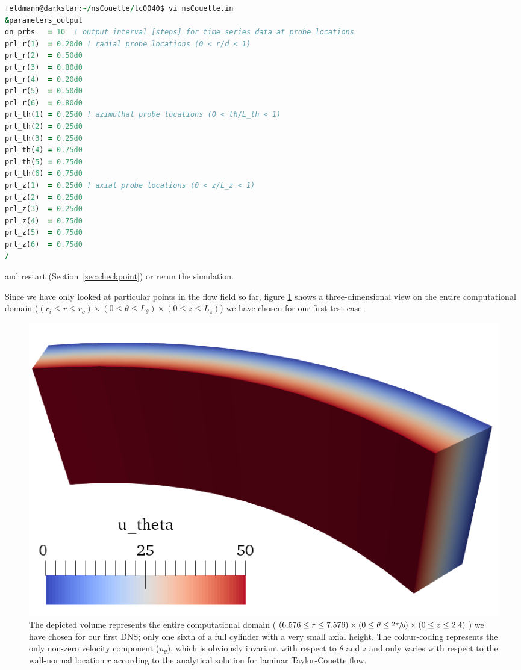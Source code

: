 \documentclass[a4paper, 11pt, DIV=11]{scrartcl}
\begin{document}
\begin{lstlisting}[language=Fortran]
feldmann@darkstar:~/nsCouette/tc0040$ vi nsCouette.in
&parameters_output
dn_prbs   = 10  ! output interval [steps] for time series data at probe locations
prl_r(1)  = 0.20d0 ! radial probe locations (0 < r/d < 1)
prl_r(2)  = 0.50d0
prl_r(3)  = 0.80d0
prl_r(4)  = 0.20d0
prl_r(5)  = 0.50d0
prl_r(6)  = 0.80d0
prl_th(1) = 0.25d0 ! azimuthal probe locations (0 < th/L_th < 1)
prl_th(2) = 0.25d0
prl_th(3) = 0.25d0
prl_th(4) = 0.75d0
prl_th(5) = 0.75d0
prl_th(6) = 0.75d0
prl_z(1)  = 0.25d0 ! axial probe locations (0 < z/L_z < 1)
prl_z(2)  = 0.25d0
prl_z(3)  = 0.25d0
prl_z(4)  = 0.75d0
prl_z(5)  = 0.75d0
prl_z(6)  = 0.75d0
/
\end{lstlisting}
and restart (Section~\ref{sec:checkpoint}) or rerun the simulation.
\par
Since we have only looked at particular points in the flow field so far,
figure \ref{fig:tc0040laminarTaylorCouette} shows a three-dimensional
view on the entire computational domain ($(r_{i}\le r\le r_{o}) \times
(\num{0}\le\theta\le L_{\theta}) \times (\num{0}\le z\le L_{z})$) we have
chosen for our first test case.
\begin{figure}[htb]
\centering
\includegraphics[width=1.00\textwidth]{figures/tc0040/laminarTaylorCouette.png}
\caption{The depicted volume represents the entire computational domain
($(\num{6.576}\le r\le\num{7.576}) \times (\num{0}\le\theta\le\sfrac{2\pi}{6})
\times (\num{0}\le z\le\num{2.4})$) we have chosen for our first DNS; \ie only
one sixth of a full cylinder with a very small axial height. The colour-coding
represents the only non-zero velocity component ($u_{\theta}$), which is
obviously invariant with respect to $\theta$ and $z$ and only varies with
respect to the wall-normal location $r$ according to the analytical solution
for laminar Taylor-Couette flow.}
\label{fig:tc0040laminarTaylorCouette}
\end{figure}
\end{document}

